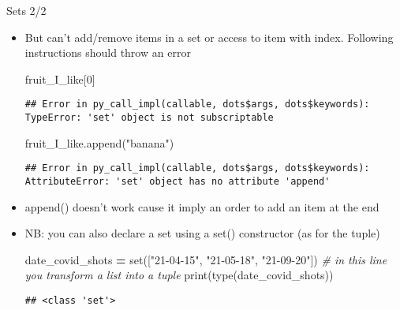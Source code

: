 \documentclass[
  8pt,
  ignorenonframetext,
]{beamer}
\newenvironment{Shaded}{\begin{snugshade}}{\end{snugshade}}
\newcommand{\BuiltInTok}[1]{#1}
\newcommand{\CommentTok}[1]{\textcolor[rgb]{0.56,0.35,0.01}{\textit{#1}}}
\newcommand{\DecValTok}[1]{\textcolor[rgb]{0.00,0.00,0.81}{#1}}
\newcommand{\NormalTok}[1]{#1}
\newcommand{\OperatorTok}[1]{\textcolor[rgb]{0.81,0.36,0.00}{\textbf{#1}}}
\newcommand{\StringTok}[1]{\textcolor[rgb]{0.31,0.60,0.02}{#1}}
\providecommand{\tightlist}{%
  \setlength{\itemsep}{0pt}\setlength{\parskip}{0pt}}
\begin{document}
\begin{frame}[fragile]{Sets 2/2}
\protect\hypertarget{sets-22}{}
\begin{itemize}[<+->]
\item
  But can't add/remove items in a set or access to item with index.
  Following instructions should throw an error

\begin{Shaded}
\begin{Highlighting}[]
\NormalTok{fruit\_I\_like[}\DecValTok{0}\NormalTok{]}
\end{Highlighting}
\end{Shaded}

\begin{verbatim}
## Error in py_call_impl(callable, dots$args, dots$keywords): TypeError: 'set' object is not subscriptable
\end{verbatim}

\begin{Shaded}
\begin{Highlighting}[]
\NormalTok{fruit\_I\_like.append(}\StringTok{"banana"}\NormalTok{)}
\end{Highlighting}
\end{Shaded}

\begin{verbatim}
## Error in py_call_impl(callable, dots$args, dots$keywords): AttributeError: 'set' object has no attribute 'append'
\end{verbatim}
\end{itemize}

\begin{itemize}
\tightlist
\item
  append() doesn't work cause it imply an order to add an item at the
  end
\end{itemize}

\begin{itemize}[<+->]
\item
  NB: you can also declare a set using a set() constructor (as for the
  tuple)

\begin{Shaded}
\begin{Highlighting}[]
\NormalTok{date\_covid\_shots }\OperatorTok{=} \BuiltInTok{set}\NormalTok{([}\StringTok{"21{-}04{-}15"}\NormalTok{, }\StringTok{"21{-}05{-}18"}\NormalTok{, }\StringTok{"21{-}09{-}20"}\NormalTok{])}
\CommentTok{\# in this line you transform a list into a tuple}
\BuiltInTok{print}\NormalTok{(}\BuiltInTok{type}\NormalTok{(date\_covid\_shots))}
\end{Highlighting}
\end{Shaded}

\begin{verbatim}
## <class 'set'>
\end{verbatim}
\end{itemize}
\end{frame}
\end{document}
